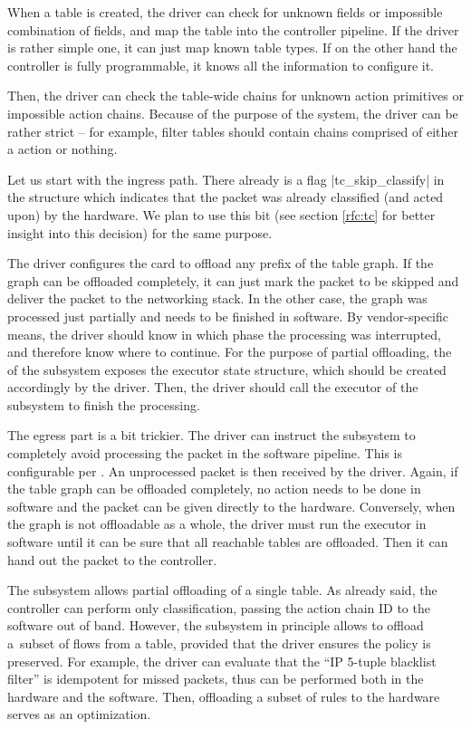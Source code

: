 When a table is created, the driver can check for unknown fields or impossible
combination of fields, and map the table into the controller pipeline. If the
driver is rather simple one, it can just map known table types. If on the other
hand the controller is fully programmable, it knows all the information to
configure it.

Then, the driver can check the table-wide chains for unknown action primitives or
impossible action chains. Because of the purpose of the system, the driver can
be rather strict -- for example, filter tables should contain chains comprised
of either a  action or nothing.

Let us start with the ingress path. There already is a flag
\field|tc_skip_classify| in the \skb{} structure which indicates that
the packet was already classified (and acted upon) by the hardware. We plan to
use this bit (see section \ref{rfc:tc} for better insight into this decision)
for the same purpose.

The driver configures the card to offload any prefix of the table graph. If the
graph can be offloaded completely, it can just mark the packet to be skipped
and deliver the packet to the networking stack. In the other case,
the graph was processed just partially and needs to be finished in software. By
vendor-specific means, the driver should know in which phase the processing was
interrupted, and therefore know where to continue. For the purpose of partial
offloading, the  of the subsystem exposes the executor state
structure, which should be created accordingly by the driver. Then, the driver
should call the executor of the subsystem to finish the processing.

The egress part is a bit trickier. The driver can instruct the subsystem to
completely avoid processing the packet in the software pipeline. This is
configurable per \netdev. An unprocessed packet is then received by the
driver. Again, if the table graph can be offloaded completely, no action needs
to be done in software and the packet can be given directly to the hardware.
Conversely, when the graph is not offloadable as a whole, the driver must
run the executor in software until it can be sure that all reachable tables are
offloaded. Then it can hand out the packet to the controller.

The subsystem allows partial offloading of a single table. As already said, the
controller can perform only classification, passing the action chain ID to the
software out of band. However, the subsystem in principle allows to offload
a~subset of flows from a table, provided that the driver ensures the policy is
preserved. For example, the driver can evaluate that the ``IP 5-tuple blacklist
filter'' is idempotent for missed packets, thus can be performed both in the
hardware and the software. Then, offloading a subset of rules to the hardware
serves as an optimization.

